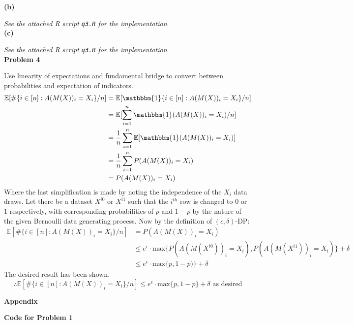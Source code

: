 \documentclass[12pt]{article}
\begin{document}
\textbf{(b)} 

\emph{See the attached R script \texttt{q3.R} for the implementation}.\\

\textbf{(c)} 

\emph{See the attached R script \texttt{q3.R} for the implementation}.\\

{\large\textbf{Problem 4}}

Use linearity of expectations and fundamental bridge to convert between probabilities and expectation of indicators.
\begin{align*}
	\mathbb{E}[\#\{ i\in [n]: A(M(X))_i = X_i\} / n] &= \mathbb{E}[\mathbbm{1}\{ i\in [n]: A(M(X))_i = X_i\} / n]\\
	&= \mathbb{E}[\sum\limits^n_{i=1}\mathbbm{1}(A(M(X))_i = X_i) / n]\\
	&= \dfrac{1}{n}\sum\limits^n_{i=1}\mathbb{E}[\mathbbm{1}(A(M(X))_i = X_i)]\\
	&= \dfrac{1}{n}\sum\limits^n_{i=1}P(A(M(X))_i = X_i)\\
	&= P(A(M(X))_i = X_i)
\end{align*}
Where the last simplification is made by noting the independence of the $X_i$ data draws. Let there be a dataset $X^{i0}$ or $X^{i1}$ such that the $i^{th}$ row is changed to 0 or 1 respectively, with corresponding probabilities of $p$ and $1-p$ by the nature of the given Bernoulli data generating process. Now by the definition of $(\epsilon, \delta)$-DP:
\begin{align*}
	\mathbb{E}[\#\{ i\in [n]: A(M(X))_i = X_i\} / n] &= P(A(M(X))_i = X_i)\\
	&\leq e^{\epsilon}\cdot \text{max}\{P(A(M(X^{i0}))_i = X_i),P(A(M(X^{i1}))_i = X_i)\} + \delta\\
	&\leq e^{\epsilon}\cdot \text{max}\{p, 1-p)\} + \delta
\end{align*}
The desired result has been shown.
\[\therefore\boxed{\mathbb{E}[\#\{ i\in [n]: A(M(X))_i = X_i\} / n] \leq e^{\epsilon} \cdot \text{max}\{p, 1-p\} + \delta}\text{ as desired}\]



\pagebreak

{\large\textbf{Appendix}}

\textbf{Code for Problem 1}

\begin{lstlisting}[language=R]
\end{lstlisting}
\end{document}
